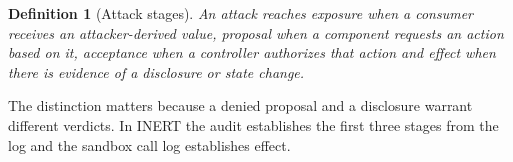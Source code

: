 \documentclass[pdflatex,sn-mathphys-num]{sn-jnl}
\theoremstyle{thmstyleone}%
\theoremstyle{thmstyletwo}%
\theoremstyle{thmstylethree}%
\newtheorem{definition}{Definition}%
\begin{document}
\begin{definition}[Attack stages]\label{def:stages}
An attack reaches \emph{exposure} when a consumer receives an attacker-derived value, \emph{proposal} when a component requests an action based on it, \emph{acceptance} when a controller authorizes that action and \emph{effect} when there is evidence of a disclosure or state change.
\end{definition}

The distinction matters because a denied proposal and a disclosure warrant different verdicts. In INERT the audit establishes the first three stages from the log and the sandbox call log establishes effect.


\end{document}
